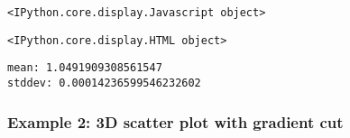 \documentclass[11pt]{article}
\begin{document}
    
    \begin{verbatim}
<IPython.core.display.Javascript object>
    \end{verbatim}

    
    
    \begin{verbatim}
<IPython.core.display.HTML object>
    \end{verbatim}

    
    \begin{Verbatim}[commandchars=\\\{\}]
mean: 1.0491909308561547 
stddev: 0.00014236599546232602

    \end{Verbatim}

    \subsubsection{Example 2: 3D scatter plot with gradient
cut}\label{example-2-3d-scatter-plot-with-gradient-cut}
\end{document}
